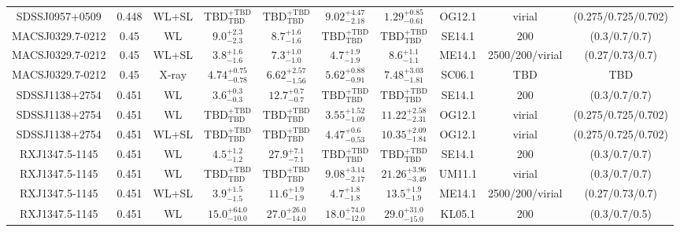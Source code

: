 \begin{table}
\begin{tabular}{cccccccccc}
SDSSJ0957+0509 & 0.448 & WL+SL & ${\mathrm{TBD}}^{+\mathrm{TBD}}_{\mathrm{TBD}}$ & ${\mathrm{TBD}}^{+\mathrm{TBD}}_{\mathrm{TBD}}$ & ${9.02}^{+4.47}_{-2.18}$ & ${1.29}^{+0.85}_{-0.61}$ & OG12.1 & virial & (0.275/0.725/0.702) \\
MACSJ0329.7-0212 & 0.45 & WL & ${9.0}^{+2.3}_{-2.3}$ & ${8.7}^{+1.6}_{-1.6}$ & ${\mathrm{TBD}}^{+\mathrm{TBD}}_{\mathrm{TBD}}$ & ${\mathrm{TBD}}^{+\mathrm{TBD}}_{\mathrm{TBD}}$ & SE14.1 & 200 & (0.3/0.7/0.7) \\
MACSJ0329.7-0212 & 0.45 & WL+SL & ${3.8}^{+1.6}_{-1.6}$ & ${7.3}^{+1.0}_{-1.0}$ & ${4.7}^{+1.9}_{-1.9}$ & ${8.6}^{+1.1}_{-1.1}$ & ME14.1 & 2500/200/virial & (0.27/0.73/0.7) \\
MACSJ0329.7-0212 & 0.45 & X-ray & ${4.74}^{+0.75}_{-0.78}$ & ${6.62}^{+2.57}_{-1.56}$ & ${5.62}^{+0.88}_{-0.91}$ & ${7.48}^{+3.03}_{-1.81}$ & SC06.1 & TBD & TBD \\
SDSSJ1138+2754 & 0.451 & WL & ${3.6}^{+0.3}_{-0.3}$ & ${12.7}^{+0.7}_{-0.7}$ & ${\mathrm{TBD}}^{+\mathrm{TBD}}_{\mathrm{TBD}}$ & ${\mathrm{TBD}}^{+\mathrm{TBD}}_{\mathrm{TBD}}$ & SE14.1 & 200 & (0.3/0.7/0.7) \\
SDSSJ1138+2754 & 0.451 & WL & ${\mathrm{TBD}}^{+\mathrm{TBD}}_{\mathrm{TBD}}$ & ${\mathrm{TBD}}^{+\mathrm{TBD}}_{\mathrm{TBD}}$ & ${3.55}^{+1.52}_{-1.09}$ & ${11.22}^{+2.58}_{-2.31}$ & OG12.1 & virial & (0.275/0.725/0.702) \\
SDSSJ1138+2754 & 0.451 & WL+SL & ${\mathrm{TBD}}^{+\mathrm{TBD}}_{\mathrm{TBD}}$ & ${\mathrm{TBD}}^{+\mathrm{TBD}}_{\mathrm{TBD}}$ & ${4.47}^{+0.6}_{-0.53}$ & ${10.35}^{+2.09}_{-1.84}$ & OG12.1 & virial & (0.275/0.725/0.702) \\
RXJ1347.5-1145 & 0.451 & WL & ${4.5}^{+1.2}_{-1.2}$ & ${27.9}^{+7.1}_{-7.1}$ & ${\mathrm{TBD}}^{+\mathrm{TBD}}_{\mathrm{TBD}}$ & ${\mathrm{TBD}}^{+\mathrm{TBD}}_{\mathrm{TBD}}$ & SE14.1 & 200 & (0.3/0.7/0.7) \\
RXJ1347.5-1145 & 0.451 & WL & ${\mathrm{TBD}}^{+\mathrm{TBD}}_{\mathrm{TBD}}$ & ${\mathrm{TBD}}^{+\mathrm{TBD}}_{\mathrm{TBD}}$ & ${9.08}^{+3.14}_{-2.17}$ & ${21.26}^{+3.96}_{-3.49}$ & UM11.1 & virial & (0.3/0.7/0.7) \\
RXJ1347.5-1145 & 0.451 & WL+SL & ${3.9}^{+1.5}_{-1.5}$ & ${11.6}^{+1.9}_{-1.9}$ & ${4.7}^{+1.8}_{-1.8}$ & ${13.5}^{+1.9}_{-1.9}$ & ME14.1 & 2500/200/virial & (0.27/0.73/0.7) \\
RXJ1347.5-1145 & 0.451 & WL & ${15.0}^{+64.0}_{-10.0}$ & ${27.0}^{+26.0}_{-14.0}$ & ${18.0}^{+74.0}_{-12.0}$ & ${29.0}^{+31.0}_{-15.0}$ & KL05.1 & 200 & (0.3/0.7/0.5) \\

\end{tabular}
\end{table}
